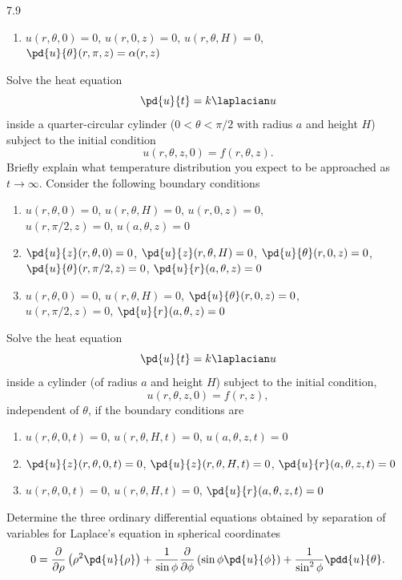 \begin{exercises}{7.9}
\begin{enumerate}
\item[(d)] $u(r,\theta,0) = 0$, \quad $u(r,0,z) = 0$, \quad $u(r,\theta,H) = 0$, \\
$\pd{u}{\theta}(r,\pi,z) = \alpha(r,z)$
\end{enumerate}

\item Solve the heat equation
\[
\pd{u}{t} = k\laplacian u
\]
inside a quarter-circular cylinder ($0 < \theta < \pi/2$ with radius $a$ and height $H$) subject to the initial condition
\[
u(r,\theta,z,0) = f(r,\theta,z).
\]
Briefly explain what temperature distribution you expect to be approached as $t \to \infty$.  Consider the following boundary conditions

\begin{enumerate}
\item[(a)] $u(r,\theta,0) = 0$, \quad $u(r,\theta,H) = 0$, \quad $u(r,0,z) = 0$, \\
$u(r,\pi/2,z) = 0$, \quad $u(a,\theta,z) = 0$

\item[\starred(b)] $\pd{u}{z}(r,\theta,0) = 0$, \quad $\pd{u}{z}(r,\theta,H) = 0$, \quad $\pd{u}{\theta}(r,0,z) = 0$, \\
$\pd{u}{\theta}(r,\pi/2,z) = 0$, \quad $\pd{u}{r}(a,\theta,z) = 0$

\item[(c)] $u(r,\theta,0) = 0$, \quad $u(r,\theta,H) = 0$, \quad $\pd{u}{\theta}(r,0,z) = 0$, \\
$u(r,\pi/2,z) = 0$, \quad $\pd{u}{r}(a,\theta,z) = 0$
\end{enumerate}

\item Solve the heat equation
\[
\pd{u}{t} = k\laplacian u
\]
inside a cylinder (of radius $a$ and height $H$) subject to the initial condition,
\[
u(r,\theta,z,0) = f(r,z),
\]
independent of $\theta$, if the boundary conditions are

\begin{enumerate}
\item[\starred(a)] $u(r,\theta,0,t) = 0$, \quad $u(r,\theta,H,t) = 0$, \quad $u(a,\theta,z,t) = 0$

\item[(b)] $\pd{u}{z}(r,\theta,0,t) = 0$, \quad $\pd{u}{z}(r,\theta,H,t) = 0$, \quad $\pd{u}{r}(a,\theta,z,t) = 0$

\item[(c)] $u(r,\theta,0,t) = 0$, \quad $u(r,\theta,H,t) = 0$, \quad $\pd{u}{r}(a,\theta,z,t) = 0$
\end{enumerate}

\item Determine the three ordinary differential equations obtained by separation of variables for Laplace's equation in spherical coordinates
\[
0 = \frac{\partial}{\partial \rho}\left(\rho^2\pd{u}{\rho}\right) + \frac{1}{\sin\phi}\frac{\partial}{\partial \phi}\left(\sin\phi\pd{u}{\phi}\right) + \frac{1}{\sin^2\phi}\pdd{u}{\theta}.
\]

\end{exercises}

